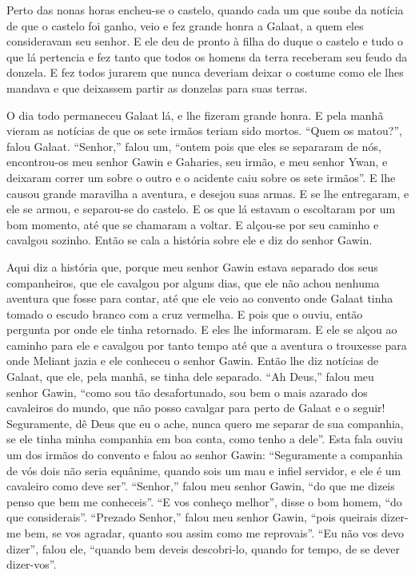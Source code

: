Perto das nonas horas encheu-se o castelo, quando cada um que soube da notícia
de que o castelo foi ganho, veio e fez grande honra a Galaat, a quem eles
consideravam seu senhor. E ele deu de pronto à filha do duque o castelo e tudo
o que lá pertencia e fez tanto que todos os homens da terra receberam seu feudo
da donzela. E fez todos jurarem que nunca deveriam deixar o costume como ele
lhes mandava e que deixassem partir as donzelas para suas terras.

O dia todo permaneceu Galaat lá, e lhe fizeram grande honra. E pela manhã vieram
as notícias de que os sete irmãos teriam sido mortos. “Quem os matou?”, falou
Galaat. “Senhor,” falou um, “ontem pois que eles se separaram de nós,
encontrou-os meu senhor Gawin e Gaharies, seu irmão, e meu senhor Ywan, e
deixaram correr um sobre o outro e o acidente caiu sobre os sete irmãos''. E lhe
causou grande maravilha a aventura, e desejou suas armas. E se lhe entregaram,
e ele se armou, e separou-se do castelo. E os que lá estavam o escoltaram por
um bom momento, até que se chamaram a voltar. E alçou-se por seu caminho e
cavalgou sozinho. Então se cala a história sobre ele e diz do senhor Gawin. 

Aqui diz a história que, porque meu senhor Gawin  estava separado dos
seus companheiros, que ele cavalgou por alguns dias, que ele não achou nenhuma
aventura que fosse para contar, até que ele veio ao convento onde Galaat tinha
tomado o escudo branco com a cruz vermelha. E pois que o ouviu, então pergunta
por onde ele tinha retornado. E eles lhe informaram. E ele se alçou ao caminho
para ele e cavalgou por tanto tempo até que a aventura o trouxesse para onde
Meliant jazia e ele conheceu o senhor Gawin. Então lhe diz notícias de Galaat,
que ele, pela manhã, se tinha dele separado. “Ah Deus,” falou meu senhor Gawin,
``como sou tão desafortunado, sou bem o mais azarado dos cavaleiros do
mundo, que não posso cavalgar para perto de Galaat e o seguir! Seguramente, dê
Deus que eu o ache, nunca quero me separar de sua companhia, se ele tinha minha
companhia em boa conta, como tenho a dele”. Esta fala ouviu um dos irmãos do
convento e falou ao senhor Gawin: “Seguramente a companhia de vós dois não
seria equânime, quando sois um mau e infiel servidor,  e ele é um cavaleiro
como deve ser”.  “Senhor,” falou meu senhor Gawin,  “do que me dizeis
penso que bem me conheceis”. “E vos conheço melhor”, disse o bom homem, “do que
considerais”. “Prezado Senhor,” falou meu senhor Gawin,  “pois queirais
dizer-me bem, se vos agradar, quanto sou assim como me reprovais”. “Eu não vos
devo dizer”, falou ele, “quando bem deveis descobri-lo, quando for tempo, de se
dever dizer-vos”. 

